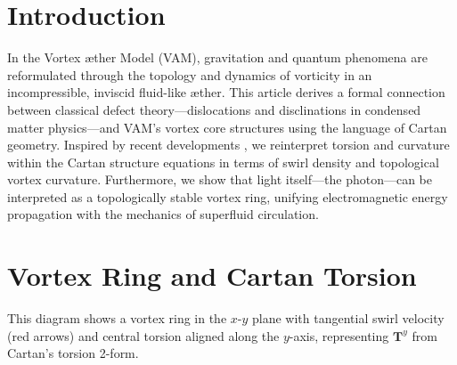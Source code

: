 \section{Introduction}
    In the Vortex \ae ther Model (VAM), gravitation and quantum phenomena are reformulated through the topology and dynamics of vorticity in an incompressible, inviscid fluid-like \ae ther. This article derives a formal connection between classical defect theory---dislocations and disclinations in condensed matter physics---and VAM's vortex core structures using the language of Cartan geometry. Inspired by recent developments \cite{kobayashi2025}, we reinterpret torsion and curvature within the Cartan structure equations in terms of swirl density and topological vortex curvature. Furthermore, we show that light itself---the photon---can be interpreted as a topologically stable vortex ring, unifying electromagnetic energy propagation with the mechanics of superfluid circulation.


\section{Vortex Ring and Cartan Torsion}

\begin{center}
\end{center}


\noindent
This diagram shows a vortex ring in the $x$-$y$ plane with tangential swirl velocity (red arrows) and central torsion aligned along the $y$-axis,
representing $\mathbf{T}^y$ from Cartan's torsion 2-form.

